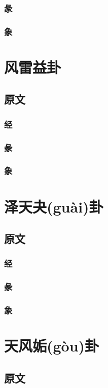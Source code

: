 \documentclass[12pt,oneside]{book}
\begin{document}
\subsection{彖}
\subsection{象}

\chapter{风雷益卦}
\section{原文}
\subsection{经}
\subsection{彖}
\subsection{象}

\chapter{泽天夬(guài)卦}
\section{原文}
\subsection{经}
\subsection{彖}
\subsection{象}



\chapter{天风姤(gòu)卦}
\section{原文}
\end{document}
